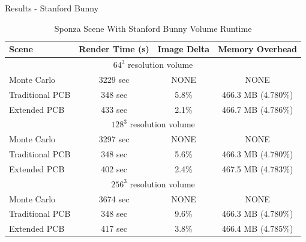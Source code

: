 \documentclass[10pt,compress,professionalfont]{beamer}
\begin{document}
\begin{frame}{Results - Stanford Bunny}

    \begin{changemargin}{-4mm}{0cm}
        \begin{table}
        \begin{center}
        \begin{tabular}{ | l | c | c | c | }
          \hline                       
          Scene & Render Time (s) & Image Delta & Memory Overhead \\

          \hline
          \multicolumn{4}{|c|}{$64^3$ resolution volume} \\     
          \hline            

          Monte Carlo & 3229 sec & NONE & NONE \\
          Traditional PCB & 348 sec & 5.8\% & 466.3 MB (4.780\%) \\
          Extended PCB & 433 sec & 2.1\% & 466.7 MB (4.786\%)  \\

          \hline
          \multicolumn{4}{|c|}{$128^3$ resolution volume} \\     
          \hline            
                     
          Monte Carlo & 3297 sec & NONE & NONE \\
          Traditional PCB & 348 sec & 5.6\% & 466.3 MB (4.780\%) \\
          Extended PCB & 402 sec & 2.4\% & 467.5 MB (4.783\%)  \\

          \hline
          \multicolumn{4}{|c|}{$256^3$ resolution volume} \\     
          \hline            
                     
          Monte Carlo & 3674 sec & NONE & NONE \\
          Traditional PCB & 348 sec & 9.6\% & 466.3 MB (4.780\%) \\
          Extended PCB & 417 sec & 3.8\% & 466.4 MB (4.785\%)  \\
          \hline  

        \end{tabular}
        \caption{Sponza Scene With Stanford Bunny Volume Runtime}
        \end{center}
        \end{table}
    \end{changemargin}

\end{frame}
\end{document}
